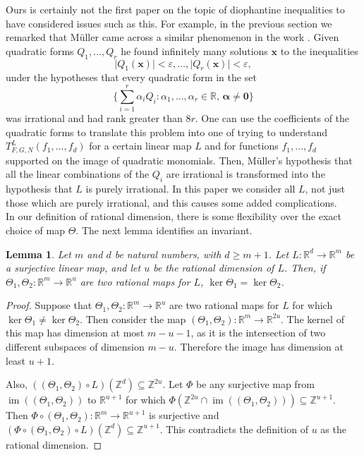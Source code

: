 \documentclass[12pt,a4paper,twoside,reqno]{amsart}
\newtheorem{Lemma}[Theorem]{Lemma}
\newcommand{\ba}{\boldsymbol{\alpha}}
\newcommand{\im}{\operatorname{im}}
\numberwithin{equation}{section}
\begin{document}
Ours is certainly not the first paper on the topic of diophantine inequalities to have considered issues such as this. For example, in the previous section we remarked that M\"{u}ller came across a similar phenomenon in the work \cite{Mu05}. Given quadratic forms $Q_1, \dots, Q_r$ he found infinitely many solutions $\mathbf{x}$ to the inequalities \[\vert Q_1(\mathbf{x})\vert < \varepsilon, \dots, \vert Q_{r}(\mathbf{x})\vert  < \varepsilon,\] under the hypotheses that every quadratic form in the set \[ \{ \sum\limits_{i=1}^r \alpha_i Q_i : \alpha_1,\dots, \alpha_r\in \mathbb{R}, \, \ba \neq \mathbf{0}\}\] was irrational and had rank greater than $8r$. One can use the coefficients of the quadratic forms to translate this problem into one of trying to understand $T_{F,G,N}^L(f_1,\dots,f_d)$ for a certain linear map $L$ and for functions $f_1,\dots,f_d$ supported on the image of quadratic monomials. Then, M\"{u}ller's hypothesis that all the linear combinations of the $Q_i$ are irrational is transformed into the hypothesis that $L$ is purely irrational. In this paper we consider all $L$, not just those which are purely irrational, and this causes some added complications. \\

In our definition of rational dimension, there is some flexibility over the exact choice of map $\Theta$. The next lemma identifies an invariant.
\begin{Lemma}
\label{Lemma invariant space}
Let $m$ and $d$ be natural numbers, with $d\geqslant m+1$. Let $L:\mathbb{R}^d\longrightarrow \mathbb{R}^m$ be a surjective linear map, and let $u$ be the rational dimension of $L$. Then, if $\Theta_1,\Theta_2: \mathbb{R}^m \longrightarrow \mathbb{R}^u$ are two rational maps for $L$, $\ker \Theta_1 = \ker \Theta_2$.
\end{Lemma}
\begin{proof}
Suppose that $\Theta_1,\Theta_2:\mathbb{R}^m \longrightarrow \mathbb{R}^u$ are two rational maps for $L$ for which $\ker \Theta_1 \neq \ker \Theta_2$. Then consider the map $(\Theta_1,\Theta_2):\mathbb{R}^m\longrightarrow \mathbb{R}^{2u}.$ The kernel of this map has dimension at most $m-u-1$, as it is the intersection of two different subspaces of dimension $m-u$. Therefore the image has dimension at least $u+1$. 

Also, $((\Theta_1,\Theta_2) \circ L ) (\mathbb{Z}^d) \subseteq \mathbb{Z}^{2u}. $ Let $\Phi$ be any surjective map from $\im ((\Theta_1,\Theta_2))$ to $\mathbb{R}^{u+1}$  for which $\Phi(\mathbb{Z}^{2u}\cap\im ((\Theta_1,\Theta_2))) \subseteq\mathbb{Z}^{u+1}$. Then $\Phi \circ (\Theta_1,\Theta_2):\mathbb{R}^m \longrightarrow \mathbb{R}^{u+1}$ is surjective and $(\Phi \circ (\Theta_1,\Theta_2) \circ L)(\mathbb{Z}^d) \subseteq \mathbb{Z}^{u+1}$. This contradicts the definition of $u$ as the rational dimension. 
\end{proof}
\end{document}
